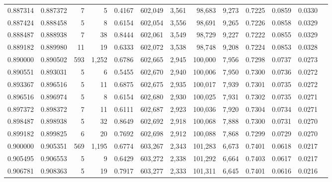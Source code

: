 \begin{tabular}{rrrrrrrrrrrrr}
0.887314 & 0.887372 &      7 &     5 &                                     0.4167 & 602,049 &   3,561 &  98,683 &   9,273 & 0.7225 & 0.0859 & 0.0330 \\
0.887424 & 0.888458 &      5 &     8 &                                     0.6154 & 602,054 &   3,556 &  98,691 &   9,265 & 0.7226 & 0.0858 & 0.0329 \\
0.888487 & 0.888938 &      7 &    38 &                                     0.8444 & 602,061 &   3,549 &  98,729 &   9,227 & 0.7222 & 0.0855 & 0.0329 \\
0.889182 & 0.889980 &     11 &    19 &                                     0.6333 & 602,072 &   3,538 &  98,748 &   9,208 & 0.7224 & 0.0853 & 0.0328 \\
0.890000 & 0.890502 &    593 & 1,252 &                                     0.6786 & 602,665 &   2,945 & 100,000 &   7,956 & 0.7298 & 0.0737 & 0.0273 \\
0.890551 & 0.893031 &      5 &     6 &                                     0.5455 & 602,670 &   2,940 & 100,006 &   7,950 & 0.7300 & 0.0736 & 0.0272 \\
0.893367 & 0.896516 &      5 &    11 &                                     0.6875 & 602,675 &   2,935 & 100,017 &   7,939 & 0.7301 & 0.0735 & 0.0272 \\
0.896516 & 0.896974 &      5 &     8 &                                     0.6154 & 602,680 &   2,930 & 100,025 &   7,931 & 0.7302 & 0.0735 & 0.0271 \\
0.897372 & 0.898372 &      7 &    11 &                                     0.6111 & 602,687 &   2,923 & 100,036 &   7,920 & 0.7304 & 0.0734 & 0.0271 \\
0.898487 & 0.898938 &      5 &    32 &                                     0.8649 & 602,692 &   2,918 & 100,068 &   7,888 & 0.7300 & 0.0731 & 0.0270 \\
0.899182 & 0.899825 &      6 &    20 &                                     0.7692 & 602,698 &   2,912 & 100,088 &   7,868 & 0.7299 & 0.0729 & 0.0270 \\
0.900000 & 0.905351 &    569 & 1,195 &                                     0.6774 & 603,267 &   2,343 & 101,283 &   6,673 & 0.7401 & 0.0618 & 0.0217 \\
0.905495 & 0.906553 &      5 &     9 &                                     0.6429 & 603,272 &   2,338 & 101,292 &   6,664 & 0.7403 & 0.0617 & 0.0217 \\
0.906781 & 0.908363 &      5 &    19 &                                     0.7917 & 603,277 &   2,333 & 101,311 &   6,645 & 0.7401 & 0.0616 & 0.0216 \\

\end{tabular}
